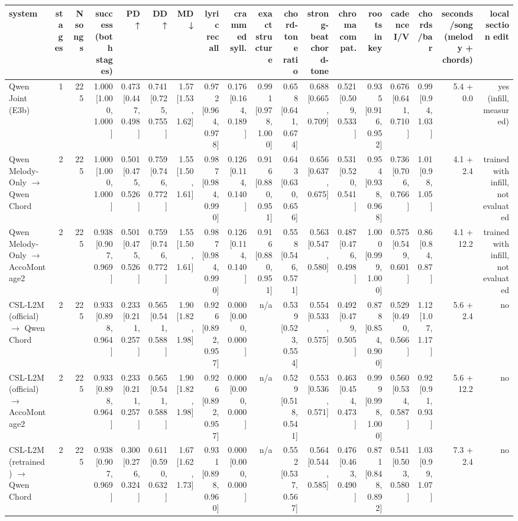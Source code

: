 \begin{table}[t]
\centering
\small
\begin{tabular}{lrrrrrrrrrrrrrrrrr}
\toprule
system & stages & N songs & success (both stages) & PD ↑ & DD ↑ & MD ↓ & lyric recall & crammed syll. & exact structure & chord-tone ratio & strong-beat chord-tone & chroma compat. & roots in key & cadence I/V & chords/bar & seconds/song (melody + chords) & local section edit \\
\midrule
Qwen Joint (E3b) & 1 & 225 & 1.000 [1.000, 1.000] & 0.473 [0.447, 0.498] & 0.741 [0.725, 0.755] & 1.57 [1.53, 1.62] & 0.972 [0.964, 0.978] & 0.176 [0.164, 0.189] & 0.991 [0.978, 1.000] & 0.658 [0.641, 0.674] & 0.688 [0.665, 0.709] & 0.521 [0.509, 0.533] & 0.935 [0.916, 0.952] & 0.676 [0.641, 0.710] & 0.99 [0.94, 1.03] & 5.4 + 0.0 & yes (infill, measured) \\
Qwen Melody-Only $\rightarrow$ Qwen Chord & 2 & 225 & 1.000 [1.000, 1.000] & 0.501 [0.475, 0.526] & 0.759 [0.746, 0.772] & 1.55 [1.50, 1.61] & 0.987 [0.984, 0.990] & 0.126 [0.114, 0.140] & 0.916 [0.880, 0.951] & 0.643 [0.630, 0.656] & 0.656 [0.637, 0.675] & 0.531 [0.520, 0.541] & 0.954 [0.938, 0.968] & 0.736 [0.706, 0.766] & 1.01 [0.98, 1.05] & 4.1 + 2.4 & trained with infill, not evaluated \\
Qwen Melody-Only $\rightarrow$ AccoMontage2 & 2 & 225 & 0.938 [0.907, 0.969] & 0.501 [0.475, 0.526] & 0.759 [0.746, 0.772] & 1.55 [1.50, 1.61] & 0.987 [0.984, 0.990] & 0.126 [0.114, 0.140] & 0.916 [0.880, 0.951] & 0.558 [0.546, 0.571] & 0.563 [0.547, 0.580] & 0.487 [0.476, 0.498] & 1.000 [0.999, 1.000] & 0.575 [0.549, 0.601] & 0.86 [0.84, 0.87] & 4.1 + 12.2 & trained with infill, not evaluated \\
CSL-L2M (official) $\rightarrow$ Qwen Chord & 2 & 225 & 0.933 [0.898, 0.964] & 0.233 [0.211, 0.257] & 0.565 [0.541, 0.588] & 1.90 [1.82, 1.98] & 0.926 [0.892, 0.957] & 0.000 [0.000, 0.000] & n/a & 0.539 [0.523, 0.554] & 0.554 [0.533, 0.575] & 0.492 [0.479, 0.505] & 0.878 [0.854, 0.900] & 0.529 [0.490, 0.566] & 1.12 [1.07, 1.17] & 5.6 + 2.4 & no \\
CSL-L2M (official) $\rightarrow$ AccoMontage2 & 2 & 225 & 0.933 [0.898, 0.964] & 0.233 [0.211, 0.257] & 0.565 [0.541, 0.588] & 1.90 [1.82, 1.98] & 0.926 [0.892, 0.957] & 0.000 [0.000, 0.000] & n/a & 0.529 [0.518, 0.541] & 0.553 [0.536, 0.571] & 0.463 [0.454, 0.473] & 0.999 [0.998, 1.000] & 0.560 [0.534, 0.587] & 0.92 [0.91, 0.93] & 5.6 + 12.2 & no \\
CSL-L2M (retrained) $\rightarrow$ Qwen Chord & 2 & 225 & 0.938 [0.907, 0.969] & 0.300 [0.276, 0.324] & 0.611 [0.590, 0.632] & 1.67 [1.62, 1.73] & 0.931 [0.898, 0.960] & 0.000 [0.000, 0.000] & n/a & 0.552 [0.537, 0.567] & 0.564 [0.544, 0.585] & 0.476 [0.463, 0.490] & 0.871 [0.848, 0.892] & 0.541 [0.503, 0.580] & 1.03 [0.99, 1.07] & 7.3 + 2.4 & no \\

\end{tabular}
\end{table}
